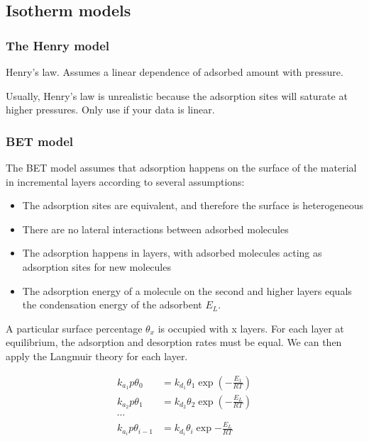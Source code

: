 \subsection{Isotherm models}


\subsubsection{The Henry model}

Henry's law. Assumes a linear dependence of adsorbed amount with
pressure.

Usually, Henry's law is unrealistic because the adsorption sites
will saturate at higher pressures.
Only use if your data is linear.

\subsubsection{BET model}

The BET model assumes that adsorption happens on the surface of the material in
incremental layers according to several assumptions:

\begin{itemize}
    \item The adsorption sites are equivalent, and therefore the surface is heterogeneous
    \item There are no lateral interactions between adsorbed molecules
    \item The adsorption happens in layers, with adsorbed molecules acting as adsorption
    sites for new molecules
    \item The adsorption energy of a molecule on the second and higher layers equals
    the condensation energy of the adsorbent \(E_L\).
\end{itemize}

A particular surface percentage \(\theta_x\) is occupied with x layers.
For each layer at equilibrium, the adsorption and desorption rates must be equal. We can
then apply the Langmuir theory for each layer.

\begin{align}
    k_{a_1} p \theta_0 &= k_{d_1} \theta_1 \exp{(-\frac{E_1}{RT})} \\
    k_{a_2} p \theta_1 &= k_{d_2} \theta_2 \exp{(-\frac{E_L}{RT})} \\
    \cdots \\
    k_{a_i} p \theta_{i-1} &= k_{d_i} \theta_i \exp{-\frac{E_L}{RT}} \\
\end{align}

